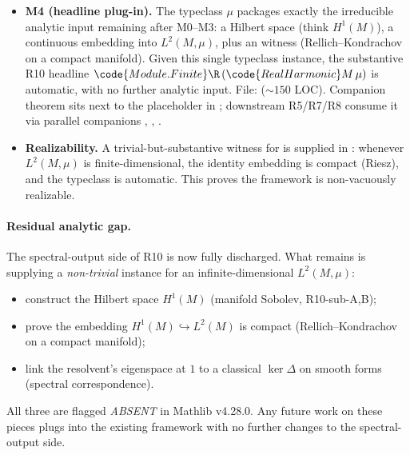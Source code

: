 \begin{itemize}
\item \textbf{M4 (headline plug-in).}  The typeclass
   $\mu$ packages exactly the
  irreducible analytic input remaining after M0--M3: a Hilbert
  space  (think $H^1(M)$), a continuous embedding
  into $L^2(M, \mu)$, plus an  witness
  (Rellich--Kondrachov on a compact manifold).  Given this single
  typeclass instance, the substantive R10 headline
  $\code{Module.Finite } \R \, (\code{RealHarmonic } M \, \mu)$
  is automatic, with no further analytic input.  File:
  ($\sim 150$ LOC).  Companion theorem
   sits next to the
  placeholder  in
  ; downstream R5/R7/R8 consume it via parallel
  companions ,
  ,
  .

\item \textbf{Realizability.}  A trivial-but-substantive witness
  for  is supplied in
  :
  whenever $L^2(M, \mu)$ is finite-dimensional, the identity
  embedding is compact (Riesz), and the typeclass is automatic.
  This proves the framework is non-vacuously realizable.
\end{itemize}

\paragraph{Residual analytic gap.}  The spectral-output side of R10
is now fully discharged.  What remains is supplying a
\emph{non-trivial}  instance for an
infinite-dimensional $L^2(M, \mu)$:
\begin{itemize}
\item construct the Hilbert space $H^1(M)$ (manifold Sobolev,
  R10-sub-A,B);
\item prove the embedding $H^1(M) \hookrightarrow L^2(M)$ is
  compact (Rellich--Kondrachov on a compact manifold);
\item link the resolvent's eigenspace at $1$ to a classical
  $\ker \Delta$ on smooth forms (spectral correspondence).
\end{itemize}
All three are flagged \emph{ABSENT} in Mathlib v4.28.0.  Any future
work on these pieces plugs into the existing framework with no
further changes to the spectral-output side.

